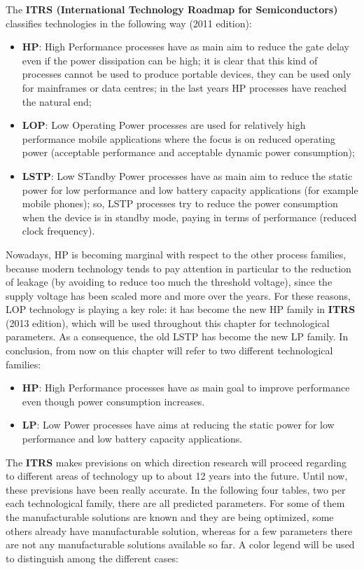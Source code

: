 \documentclass[a4paper, 12pt, twoside, openright]{report}
\begin{document}
The \textbf{ITRS (International Technology Roadmap for Semiconductors)} classifies technologies in the following way (2011 edition):

	\begin{itemize}
	\item \textbf{HP}: High Performance processes have as main aim to reduce the gate delay even if the power dissipation can be high; it is clear that this kind of processes cannot be used to produce portable devices, they can be used only for mainframes or data centres; in the last years HP processes have reached the natural end;
	\item \textbf{LOP}: Low Operating Power processes are used for relatively high performance mobile applications where the focus is on reduced operating power (acceptable performance and acceptable dynamic power consumption);
	\item \textbf{LSTP}: Low STandby Power processes have as main aim to reduce the static power for low performance and low battery capacity applications (for example mobile phones); so, LSTP processes try to reduce the power consumption when the device is in standby mode, paying in terms of performance (reduced clock frequency).
	\end{itemize}

Nowadays, HP is becoming marginal with respect to the other process families, because modern technology tends to pay attention in particular to the reduction of leakage (by avoiding to reduce too much the threshold voltage), since the supply voltage has been scaled more and more over the years. For these reasons, LOP technology is playing a key role: it has become the new HP family in \textbf{ITRS} (2013 edition), which will be used throughout this chapter for technological parameters. As a consequence, the old LSTP has become the new LP family. In conclusion, from now on this chapter will refer to two different technological families:

\begin{itemize}
\item \textbf{HP}: High Performance processes have as main goal to improve performance even though power consumption increases.
\item \textbf{LP}: Low Power processes have aims at reducing the static power for low performance and low battery capacity applications.
\end{itemize}

The \textbf{ITRS} makes previsions on which direction research will proceed regarding to different areas of technology up to about 12 years into the future. Until now, these previsions have been really accurate. In the following four tables, two per each technological family, there are all predicted parameters. For some of them the manufacturable solutions are known and they are being optimized, some others already have manufacturable solution, whereas for a few parameters there are not any manufacturable solutions available so far. A color legend will be used to distinguish among the different cases:
\end{document}

